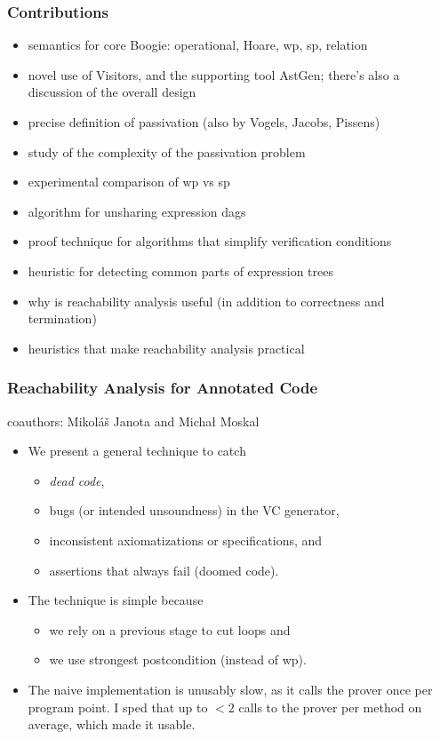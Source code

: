 \documentclass{beamer}
\begin{document}
\begin{frame}
  \frametitle{Contributions}
  \begin{itemize}
  \item semantics for core Boogie: operational, Hoare, wp, sp, relation
  \item novel use of Visitors, and the supporting tool AstGen; there's
    also a discussion of the overall design
  \item precise definition of passivation (also by Vogels, Jacobs, Pissens)
  \item study of the complexity of the passivation problem
  \item experimental comparison of wp vs sp
  \item algorithm for unsharing expression dags
  \item proof technique for algorithms that simplify verification conditions
  \item heuristic for detecting common parts of expression trees
  \item why is reachability analysis useful (in addition to correctness
    and termination)
  \item heuristics that make reachability analysis practical 
  \end{itemize}
\end{frame}
\begin{frame}
  \frametitle{Reachability Analysis for Annotated Code}
  coauthors: Mikol\'a\v{s} Janota and Micha{\l} Moskal\bigskip
  \begin{itemize}
  \item We present a general technique to catch
    \begin{itemize}
    \item \emph{dead code},
    \item bugs (or intended unsoundness) in the VC generator,
    \item inconsistent axiomatizations or specifications, and
    \item assertions that always fail (doomed code).
    \end{itemize}
  \item The technique is simple because
    \begin{itemize}
    \item we rely on a previous stage to cut loops and
    \item we use strongest postcondition (instead of wp).
    \end{itemize}
  \item The naive implementation is unusably slow, as it calls
    the prover once per program point. I sped that up to $<2$
    calls to the prover per method on average, which made it 
    usable.
  \end{itemize}
\end{frame}
\end{document}
